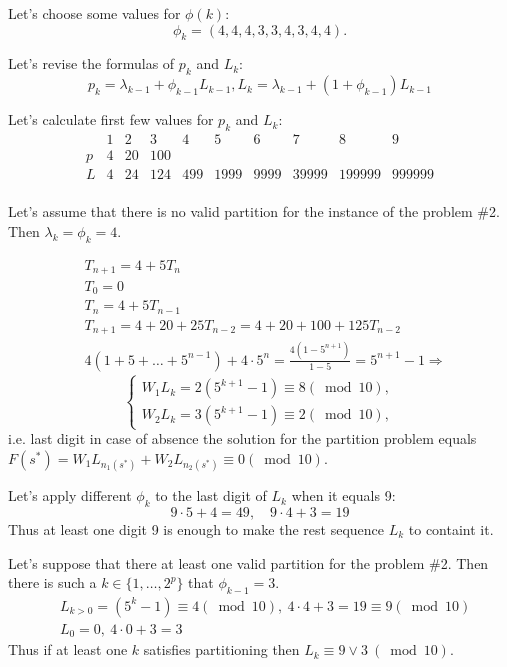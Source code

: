 \documentclass{amsart}
\begin{document}
Let's choose some values for $\phi(k)$:
\[
  \phi_k = (4, 4, 4, 3, 3, 4, 3, 4, 4).
\]

Let's revise the formulas of $p_k$ and $L_k$:
\[
  p_k=\lambda_{k-1} + \phi_{k-1}L_{k-1},
  L_k = \lambda_{k-1} + (1 + \phi_{k-1})L_{k-1}
\]

Let's calculate first few values for $p_k$ and $L_k$:
\[
  \begin{array}{r|ccccccccc}
    & 1 & 2 & 3 & 4 & 5 & 6 & 7 & 8 & 9 \\
    \hline
    p & 4 & 20 & 100 \\
    L & 4 & 24 & 124 & 499 & 1999 & 9999 & 39999 & 199999 & 999999 \\
  \end{array}
\]

Let's assume that there is no valid partition for the instance of the problem
\#2. Then $\lambda_k=\phi_k=4$.

\begin{align*}
  & T_{n+1} = 4 + 5 T_n \\
  & T_0 = 0 \\
  & T_n = 4 + 5 T_{n-1} \\
  & T_{n+1} = 4 + 20 + 25 T_{n-2}
    = 4 + 20 + 100 + 125 T_{n-2} \\
  & 4(1 + 5 + \dots + 5^{n-1}) + 4 \cdot 5^n=
    \frac{4(1-5^{n+1})}
      {1 - 5} = 5^{n+1} - 1 \Rightarrow
\end{align*}
\[
  \begin{cases}
    W_1L_k = 2 (5^{k+1}-1) \equiv 8 (\bmod 10), \\
    W_2L_k = 3 (5^{k+1}-1) \equiv 2 (\bmod 10),
  \end{cases}
\]
i.e. last digit in case of absence the solution for the partition problem
equals $F(s^*)=W_1L_{n_1(s^*)}+W_2L_{n_2(s^*)} \equiv 0 (\bmod 10)$.

Let's apply different $\phi_k$ to the last digit of $L_k$ when it equals 9:
\[
  9 \cdot 5 + 4 = 49, \quad 9 \cdot 4 + 3 = 19
\]
Thus at least one digit 9 is enough to make the rest sequence $L_k$ to containt
it.

Let's suppose that there at least one valid partition for the problem \#2.
Then there is such a $k \in \{1,\dots,2^p\}$ that $\phi_{k-1}=3$.
\begin{align*}
  & L_{k > 0}=(5^{k}-1) \equiv 4 (\bmod 10),
    \ 4 \cdot 4 + 3 = 19 \equiv 9 (\bmod 10) \\
  & L_0 = 0, \ 4 \cdot 0 + 3 = 3
\end{align*}
Thus if at least one $k$ satisfies partitioning
then $L_k \equiv 9 \lor 3 \ (\bmod 10)$.
\end{document}

